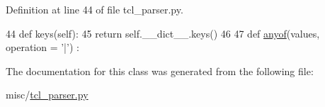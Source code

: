 Definition at line 44 of file tcl\+\_\+parser.\+py.


\begin{DoxyCode}
44     \textcolor{keyword}{def }keys(self):
45       \textcolor{keywordflow}{return} self.\_\_dict\_\_.keys()
46 
47   \textcolor{keyword}{def }\hyperlink{namespacesylva_1_1misc_1_1tcl__parser_abc9d84dd4132e13b642242dfac628084}{anyof}(values, operation = '|') :
\end{DoxyCode}


The documentation for this class was generated from the following file\+:\begin{DoxyCompactItemize}
\item 
misc/\hyperlink{tcl__parser_8py}{tcl\+\_\+parser.\+py}\end{DoxyCompactItemize}
